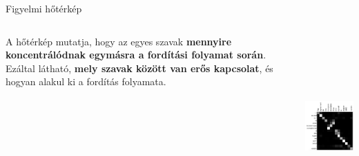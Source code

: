 \documentclass[english, aspectratio=169]{beamer}
\begin{document}
\begin{frame}{Figyelmi hőtérkép}
\begin{columns}
\begin{column}{.5\textwidth}
A hőtérkép mutatja, hogy az egyes szavak \textbf{mennyire koncentrálódnak egymásra a fordítási folyamat során}. Ezáltal látható, \textbf{mely szavak között van erős kapcsolat}, és hogyan alakul ki a fordítás folyamata.
\end{column}
\begin{column}{.5\textwidth}
\begin{center}
\includegraphics[width=6cm, height=7cm, keepaspectratio]{images/transformer_2.png}
\end{center}
\end{column}
\end{columns}
\end{frame}
\end{document}
